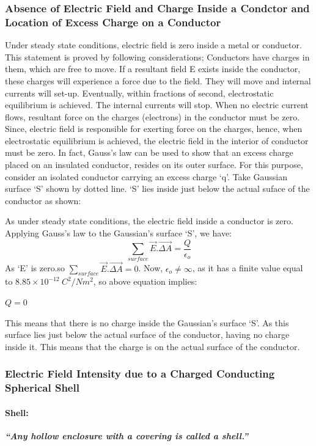 \subsubsection{Absence of Electric Field and Charge Inside
a Condctor and Location of Excess Charge on a Conductor}
Under steady state conditions, electric field is zero inside a
metal or conductor. This statement is proved by following considerations;
Conductors have charges in them, which are free to move.
If a resultant field E exists inside the conductor,
these charges will experience a force due to the field.
They will move and internal currents will set-up. Eventually,
within fractions of second, electrostatic equilibrium is achieved.
The internal currents will stop. When no electric current flows,
resultant force on the charges (electrons) in the conductor must be zero.
Since, electric field is responsible for exerting force on the charges,
hence, when electrostatic equilibrium is achieved, the electric field in
the interior of conductor must be zero.
In fact, Gauss’s law can be used to show that an excess charge
placed on an insulated conductor, resides on its outer surface.
For this purpose, consider an isolated conductor carrying an excess charge
‘q’. Take Gaussian surface ‘S’ shown by dotted line. ‘S’ lies inside just
below the actual suface of the conductor as shown:

As under steady state conditions,
the electric field inside a conductor is zero. Applying Gauss’s law to
the Gaussian’s surface ‘S’, 
we have:
\begin{equation}\label{eq:11.24}
 \sum_{surface} \vec{E}.\vec{\Delta A}  = \frac{Q}{\epsilon_{o}}
\end{equation}
As ‘E’ is zero.so $\sum_{surface} \vec{E}.\vec{\Delta A} = 0$. Now, $\epsilon_{o} \neq \infty$,
as it has a finite value equal to $8.85\times10^{-12}\:C^{2}/Nm^{2}$,
so above equation implies:
\begin{center}
  $Q=0$
\end{center}
This means that there is no charge inside the Gaussian’s surface `S'.
As this surface lies just below the actual surface of the conductor,
having no charge inside it.
This means that the charge is on the actual surface of the conductor.

\subsubsection{Electric Field Intensity due to a Charged Conducting Spherical Shell}
\paragraph{Shell:}\textbf{\textit{“Any hollow enclosure with a covering is called a shell.”}}
